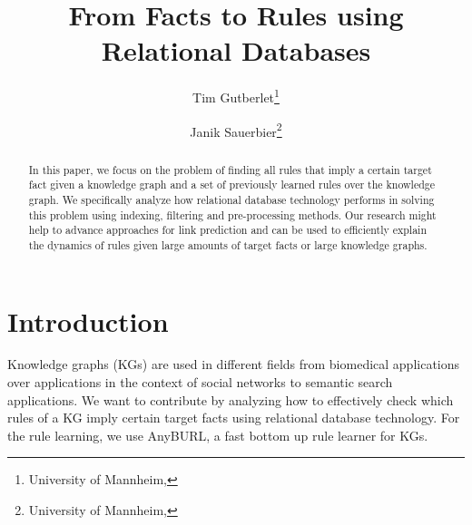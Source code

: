 \documentclass[english]{lni}
\begin{document}
\title[From Facts to Rules using Relational Databases]{From Facts to Rules using Relational Databases}
\author[Tim Gutberlet \and Janik Sauerbier]
{Tim Gutberlet\footnote{University of Mannheim, } \and
Janik Sauerbier\footnote{University of Mannheim, }}
\maketitle

\begin{abstract}
In this paper, we focus on the problem of finding all rules that imply a certain target fact given a knowledge graph and a set of previously learned rules over the knowledge graph. We specifically analyze how relational database technology performs in solving this problem using indexing, filtering and pre-processing methods. Our research might help to advance approaches for link prediction and can be used to efficiently explain the dynamics of rules given large amounts of target facts or large knowledge graphs.
\end{abstract}
\section{Introduction}
Knowledge graphs (KGs) are used in different fields from biomedical applications \cite{OpenBioLink} over applications in the context of social networks \cite{SocialNetworks} to semantic search applications\cite{SemanticSearch}. We want to contribute by analyzing how to effectively check which rules of a KG imply certain target facts using relational database technology. For the rule learning, we use AnyBURL, a fast bottom up rule learner for KGs.\cite{AnyBURL19}
\end{document}
